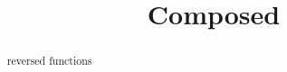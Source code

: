 \documentclass{ximera}
\title{Composed}
\begin{document}
\begin{abstract}
reversed functions
\end{abstract}
\maketitle
\end{document}
